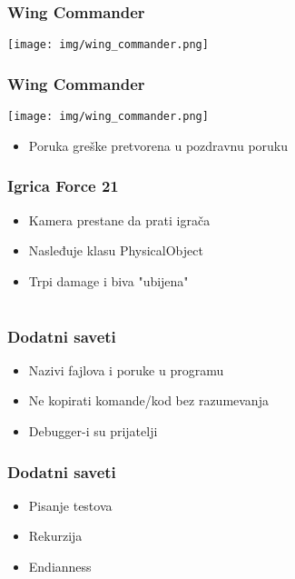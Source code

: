\documentclass{beamer}
\begin{document}
\begin{frame}
    \frametitle{Wing Commander}
    \begin{center}
        \texttt{[image: img/wing\_commander.png]}
    \end{center}
\end{frame}

\begin{frame}
    \frametitle{Wing Commander}
    \begin{center}
        \texttt{[image: img/wing\_commander.png]}
    \end{center}
    \begin{itemize}
        \item Poruka greške pretvorena u pozdravnu poruku
    \end{itemize}
\end{frame}

\begin{frame}
    \frametitle{Igrica Force 21}
    \begin{itemize}
        \item Kamera prestane da prati igrača \newline
        \item Nasleđuje klasu PhysicalObject \newline
        \item Trpi damage i biva "ubijena"
    \end{itemize}
\end{frame}

\section*{}
\begin{frame}
    \frametitle{Dodatni saveti}
    \begin{itemize}
        \item Nazivi fajlova i poruke u programu \newline
        \item Ne kopirati komande/kod bez razumevanja \newline
        \item Debugger-i su prijatelji \smiley
    \end{itemize}
\end{frame}

\begin{frame}
    \frametitle{Dodatni saveti}
    \begin{itemize}
        \item Pisanje testova \newline
        \item Rekurzija \newline
        \item Endianness
    \end{itemize}
\end{frame}
\end{document}
